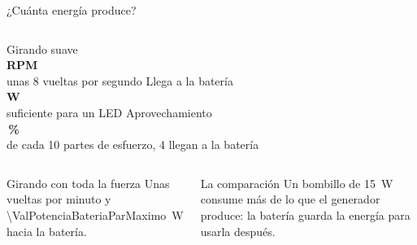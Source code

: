 \documentclass[aspectratio=169,11pt,xcolor={dvipsnames,table}]{beamer}
\newcommand{\dato}[2]{{\small\color{Gris}#1}\\[-1pt]{\Large\bfseries\color{Azul}#2}}
\begin{document}
\begin{frame}{¿Cuánta energía produce?}
  \begin{columns}[T]
    \centering
      \dato{Girando suave}{\ValRpmRegimenRef{} RPM}\\[6pt]
      {\small unas 8 vueltas por segundo}
    \centering
      \dato{Llega a la batería}{\ValPotenciaBateriaRef{} W}\\[6pt]
      {\small suficiente para un LED}
    \centering
      \dato{Aprovechamiento}{\ValEficienciaRef{}\,\%}\\[6pt]
      {\small de cada 10 partes de esfuerzo, 4 llegan a la batería}
  \end{columns}

  \vspace{0.8cm}
  \begin{columns}[T]
      \begin{exampleblock}{Girando con toda la fuerza}\small
        Unas \ValRpmParMaximo{} vueltas por minuto y \SI{\ValPotenciaBateriaParMaximo}{W} hacia la batería.
      \end{exampleblock}
      \begin{alertblock}{La comparación}\small
        Un bombillo de \SI{15}{W} consume más de lo que el generador produce:
        la batería guarda la energía para usarla después.
      \end{alertblock}
  \end{columns}
\end{frame}
\end{document}
